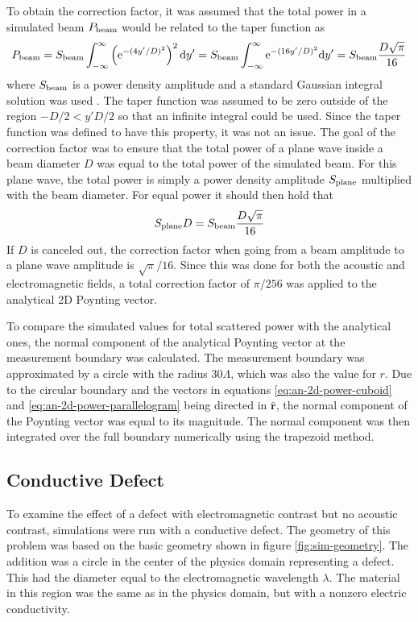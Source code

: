 \documentclass[11pt,twoside]{eitExjobb}
\begin{document}
	To obtain the correction factor, it was assumed that the total power in a simulated beam $P_{\mathrm{beam}}$ would be related to the taper function as
	\begin{equation*}
		P_{\mathrm{beam}} = S_{\mathrm{beam}} \int_{-\infty}^{\infty} \left( \mathrm{e}^{-(4y'/D)^2} \right)^2 \mathrm{d}y' = S_{\mathrm{beam}} \int_{-\infty}^{\infty} \mathrm{e}^{-(16y'/D)^2} \mathrm{d}y' = S_{\mathrm{beam}} \frac{D\sqrt{\pi}}{16}
	\end{equation*}
	where $S_{\mathrm{beam}}$ is a power density amplitude and a standard Gaussian integral solution was used \addref. The taper function was assumed to be zero outside of the region $-D/2 < y' D/2$ so that an infinite integral could be used. Since the taper function was defined to have this property, it was not an issue. The goal of the correction factor was to ensure that the total power of a plane wave inside a beam diameter $D$ was equal to the total power of the simulated beam. For this plane wave, the total power is simply a power density amplitude $S_{\mathrm{plane}}$ multiplied with the beam diameter. For equal power it should then hold that
	\begin{equation*}
		S_{\mathrm{plane}} D = S_{\mathrm{beam}} \frac{D\sqrt{\pi}}{16}
	\end{equation*}
	If $D$ is canceled out, the correction factor when going from a beam amplitude to a plane wave amplitude is $\sqrt{\pi}/16$. Since this was done for both the acoustic and electromagnetic fields, a total correction factor of $\pi/256$ was applied to the analytical 2D Poynting vector.
	
	To compare the simulated values for total scattered power with the analytical ones, the normal component of the analytical Poynting vector at the measurement boundary was calculated. The measurement boundary was approximated by a circle with the radius $30\Lambda$, which was also the value for $r$. Due to the circular boundary and the vectors in equations \eqref{eq:an-2d-power-cuboid} and \eqref{eq:an-2d-power-parallelogram} being directed in $\bm{\hat{r}}$, the normal component of the Poynting vector was equal to its magnitude. The normal component was then integrated over the full boundary numerically using the trapezoid method.
	
	\subsection{Conductive Defect}
	To examine the effect of a defect with electromagnetic contrast but no acoustic contrast, simulations were run with a conductive defect. The geometry of this problem was based on the basic geometry shown in figure \ref{fig:sim-geometry}. The addition was a circle in the center of the physics domain representing a defect. This had the diameter equal to the electromagnetic wavelength $\lambda$. The material in this region was the same as in the physics domain, but with a nonzero electric conductivity.
	
\end{document}
